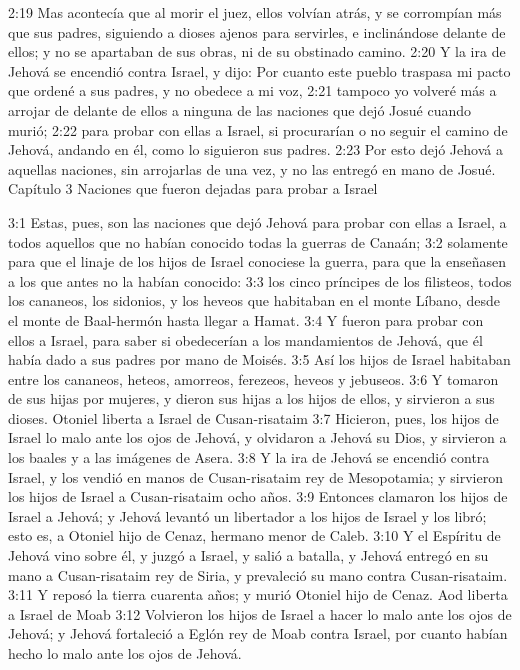 2:19 Mas acontecía que al morir el juez, ellos volvían atrás, y se corrompían más que sus padres, siguiendo a dioses ajenos para servirles, e inclinándose delante de ellos; y no se apartaban de sus obras, ni de su obstinado camino.  
2:20 Y la ira de Jehová se encendió contra Israel, y dijo: Por cuanto este pueblo traspasa mi pacto que ordené a sus padres, y no obedece a mi voz,  
2:21 tampoco yo volveré más a arrojar de delante de ellos a ninguna de las naciones que dejó Josué cuando murió;  
2:22 para probar con ellas a Israel, si procurarían o no seguir el camino de Jehová, andando en él, como lo siguieron sus padres.  
2:23 Por esto dejó Jehová a aquellas naciones, sin arrojarlas de una vez, y no las entregó en mano de Josué.  
Capítulo 3
Naciones que fueron dejadas para probar a Israel  

3:1 Estas, pues, son las naciones que dejó Jehová para probar con ellas a Israel, a todos aquellos que no habían conocido todas la guerras de Canaán;  
3:2 solamente para que el linaje de los hijos de Israel conociese la guerra, para que la enseñasen a los que antes no la habían conocido:  
3:3 los cinco príncipes de los filisteos, todos los cananeos, los sidonios, y los heveos que habitaban en el monte Líbano, desde el monte de Baal-hermón hasta llegar a Hamat.  
3:4 Y fueron para probar con ellos a Israel, para saber si obedecerían a los mandamientos de Jehová, que él había dado a sus padres por mano de Moisés.  
3:5 Así los hijos de Israel habitaban entre los cananeos, heteos, amorreos, ferezeos, heveos y jebuseos.  
3:6 Y tomaron de sus hijas por mujeres, y dieron sus hijas a los hijos de ellos, y sirvieron a sus dioses.  
Otoniel liberta a Israel de Cusan-risataim  
3:7 Hicieron, pues, los hijos de Israel lo malo ante los ojos de Jehová, y olvidaron a Jehová su Dios, y sirvieron a los baales y a las imágenes de Asera.  
3:8 Y la ira de Jehová se encendió contra Israel, y los vendió en manos de Cusan-risataim rey de Mesopotamia; y sirvieron los hijos de Israel a Cusan-risataim ocho años.  
3:9 Entonces clamaron los hijos de Israel a Jehová; y Jehová levantó un libertador a los hijos de Israel y los libró; esto es, a Otoniel hijo de Cenaz, hermano menor de Caleb.  
3:10 Y el Espíritu de Jehová vino sobre él, y juzgó a Israel, y salió a batalla, y Jehová entregó en su mano a Cusan-risataim rey de Siria, y prevaleció su mano contra Cusan-risataim.  
3:11 Y reposó la tierra cuarenta años; y murió Otoniel hijo de Cenaz.  
Aod liberta a Israel de Moab  
3:12 Volvieron los hijos de Israel a hacer lo malo ante los ojos de Jehová; y Jehová fortaleció a Eglón rey de Moab contra Israel, por cuanto habían hecho lo malo ante los ojos de Jehová.  
